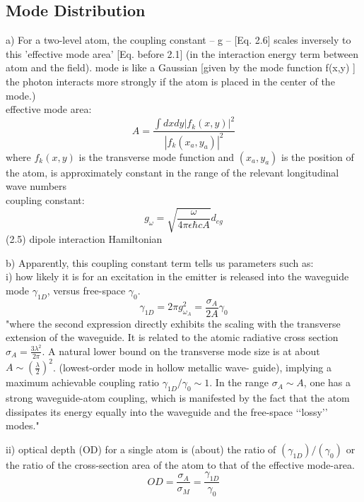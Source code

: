 \subsection{Mode Distribution}
a) For a two-level atom, the coupling constant -- g -- [Eq. 2.6] scales inversely to this 'effective mode area'  [Eq. before 2.1]  (in the interaction energy term between atom and the field).  mode is like a Gaussian [given by the mode function f(x,y) ] the photon interacts more strongly if the atom is placed in the center of the mode.)\\
effective mode area:
\begin{equation}
	A = \frac{\int dxdy|f_k(x, y)|^2}{|f_k(x_a, y_a)|^2}
\end{equation}
where $f_k(x,y)$ is the transverse mode function and $(x_a,y_a )$ is the position of the atom, is approximately constant in the range of the relevant longitudinal wave numbers\\
coupling constant:
\begin{equation}
	g_\omega = \sqrt{\frac{\omega}{4\pi\epsilon\hbar c A}}d_{eg}
\end{equation}
(2.5) dipole interaction Hamiltonian 

b) Apparently, this coupling constant term tells us parameters such as:\\
i) how likely it is for an excitation in the emitter is released into the waveguide mode $\gamma_{1D}$, versus free-space $\gamma_0$. \cite{mazoni}
\begin{equation}
	\gamma_{1D} = 2\pi g^2_{\omega_A}  = \frac{\sigma_A}{2A}\gamma_0
\end{equation}
"where the second expression directly exhibits the scaling with the transverse extension of the waveguide. It is related to the atomic radiative cross section $\sigma_A = \frac{3\lambda^2}{2\pi}$. A natural lower bound on the transverse mode size is at about $A \sim (\frac{\lambda}{2})^2$. (lowest-order mode in hollow metallic wave- guide), implying a maximum achievable coupling ratio $\gamma_{1D}/\gamma_0 \sim 1$. In the range $\sigma_A \sim A$, one has a strong waveguide-atom coupling, which is manifested by the fact that the atom dissipates its energy equally into the waveguide and the free-space ‘‘lossy’’ modes."\cite{domokos}

ii) optical depth (OD) for a single atom is (about) the ratio of $ (\gamma_{1D})/ (\gamma_{0})$ or the ratio of the cross-section area of the atom to that of the effective mode-area. 
\begin{equation}
	OD = \frac{\sigma_A}{\sigma_M} = \frac{\gamma_{1D}}{\gamma_0}
\end{equation}

